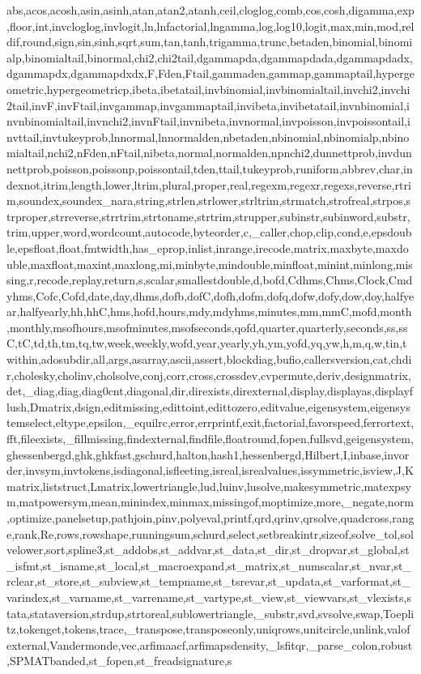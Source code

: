 {{        abs,acos,acosh,asin,asinh,atan,atan2,atanh,ceil,cloglog,comb,cos,cosh,digamma,exp,floor,int,invcloglog,invlogit,ln,lnfactorial,lngamma,log,log10,logit,max,min,mod,reldif,round,sign,sin,sinh,sqrt,sum,tan,tanh,trigamma,trunc,betaden,binomial,binomialp,binomialtail,binormal,chi2,chi2tail,dgammapda,dgammapdada,dgammapdadx,dgammapdx,dgammapdxdx,F,Fden,Ftail,gammaden,gammap,gammaptail,hypergeometric,hypergeometricp,ibeta,ibetatail,invbinomial,invbinomialtail,invchi2,invchi2tail,invF,invFtail,invgammap,invgammaptail,invibeta,invibetatail,invnbinomial,invnbinomialtail,invnchi2,invnFtail,invnibeta,invnormal,invpoisson,invpoissontail,invttail,invtukeyprob,lnnormal,lnnormalden,nbetaden,nbinomial,nbinomialp,nbinomialtail,nchi2,nFden,nFtail,nibeta,normal,normalden,npnchi2,dunnettprob,invdunnettprob,poisson,poissonp,poissontail,tden,ttail,tukeyprob,runiform,abbrev,char,indexnot,itrim,length,lower,ltrim,plural,proper,real,regexm,regexr,regexs,reverse,rtrim,soundex,soundex_nara,string,strlen,strlower,strltrim,strmatch,strofreal,strpos,strproper,strreverse,strrtrim,strtoname,strtrim,strupper,subinstr,subinword,substr,trim,upper,word,wordcount,autocode,byteorder,c,_caller,chop,clip,cond,e,epsdouble,epsfloat,float,fmtwidth,has_eprop,inlist,inrange,irecode,matrix,maxbyte,maxdouble,maxfloat,maxint,maxlong,mi,minbyte,mindouble,minfloat,minint,minlong,missing,r,recode,replay,return,s,scalar,smallestdouble,d,bofd,Cdhms,Chms,Clock,Cmdyhms,Cofc,Cofd,date,day,dhms,dofb,dofC,dofh,dofm,dofq,dofw,dofy,dow,doy,halfyear,halfyearly,hh,hhC,hms,hofd,hours,mdy,mdyhms,minutes,mm,mmC,mofd,month,monthly,msofhours,msofminutes,msofseconds,qofd,quarter,quarterly,seconds,ss,ssC,tC,td,th,tm,tq,tw,week,weekly,wofd,year,yearly,yh,ym,yofd,yq,yw,h,m,q,w,tin,twithin,adosubdir,all,args,asarray,ascii,assert,blockdiag,bufio,callersversion,cat,chdir,cholesky,cholinv,cholsolve,conj,corr,cross,crossdev,cvpermute,deriv,designmatrix,det,_diag,diag,diag0cnt,diagonal,dir,direxists,direxternal,display,displayas,displayflush,Dmatrix,dsign,editmissing,edittoint,edittozero,editvalue,eigensystem,eigensystemselect,eltype,epsilon,_equilrc,error,errprintf,exit,factorial,favorspeed,ferrortext,fft,fileexists,_fillmissing,findexternal,findfile,floatround,fopen,fullsvd,geigensystem,ghessenbergd,ghk,ghkfast,gschurd,halton,hash1,hessenbergd,Hilbert,I,inbase,invorder,invsym,invtokens,isdiagonal,isfleeting,isreal,isrealvalues,issymmetric,isview,J,Kmatrix,liststruct,Lmatrix,lowertriangle,lud,luinv,lusolve,makesymmetric,matexpsym,matpowersym,mean,minindex,minmax,missingof,moptimize,more,_negate,norm,optimize,panelsetup,pathjoin,pinv,polyeval,printf,qrd,qrinv,qrsolve,quadcross,range,rank,Re,rows,rowshape,runningsum,schurd,select,setbreakintr,sizeof,solve_tol,solvelower,sort,spline3,st_addobs,st_addvar,st_data,st_dir,st_dropvar,st_global,st_isfmt,st_isname,st_local,st_macroexpand,st_matrix,st_numscalar,st_nvar,st_rclear,st_store,st_subview,st_tempname,st_tsrevar,st_updata,st_varformat,st_varindex,st_varname,st_varrename,st_vartype,st_view,st_viewvars,st_vlexists,stata,stataversion,strdup,strtoreal,sublowertriangle,_substr,svd,svsolve,swap,Toeplitz,tokenget,tokens,trace,_transpose,transposeonly,uniqrows,unitcircle,unlink,valofexternal,Vandermonde,vec,arfimaacf,arfimapsdensity,_lsfitqr,_parse_colon,robust,SPMATbanded,st_fopen,st_freadsignature,s}}
